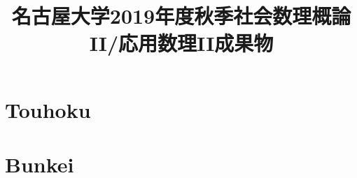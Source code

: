 \documentclass{jsarticle}
\title{名古屋大学2019年度秋季社会数理概論II/応用数理II成果物}
\author{}
\date{}
\numberwithin{equation}{answer}
\begin{document}
\maketitle


\section{Touhoku}



\section{Bunkei}



\end{document}
